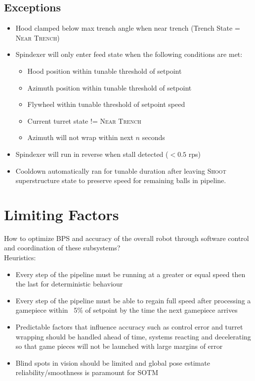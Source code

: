 \documentclass{article}
\begin{document}
		\subsection{Exceptions}
		\begin{itemize}
			\item Hood clamped below max trench angle when near trench (Trench State = \textsc{Near Trench})
			\item Spindexer will only enter feed state when the following conditions are met:
				\begin{itemize}
					\item Hood position within tunable threshold of setpoint
					\item Azimuth position within tunable threshold of setpoint
					\item Flywheel within tunable threshold of setpoint speed
					\item Current turret state != \textsc{Near Trench}
					\item Azimuth will not wrap within next $n$ seconds
				\end{itemize}
			\item Spindexer will run in reverse when stall detected ($<0.5$ rps)
			\item Cooldown automatically ran for tunable duration after leaving \textsc{Shoot} superstructure state to preserve speed for remaining balls in pipeline.
		\end{itemize}

		\section{Limiting Factors}
		How to optimize BPS and accuracy of the overall robot through software control and coordination of these subsystems?\\

		Heuristics:
		\begin{itemize}
			\item Every step of the pipeline must be running at a greater or equal speed then the last for deterministic behaviour
			\item Every step of the pipeline must be able to regain full speed after processing a gamepiece within ~5\% of setpoint by the time the next gamepiece arrives
			\item Predictable factors that influence accuracy such as control error and turret wrapping should be handled ahead of time, systems reacting and decelerating so that game pieces will not be launched with large margins of error
			\item Blind spots in vision should be limited and global pose estimate reliability/smoothness is paramount for SOTM
		\end{itemize}
\end{document}

